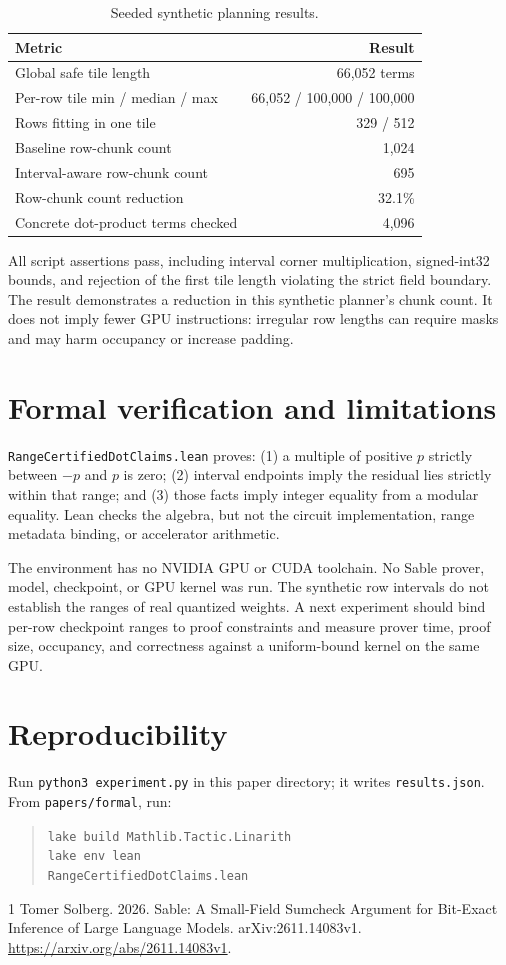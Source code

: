 \documentclass[11pt]{article}
\begin{document}
\begin{table}[t]
\centering\small
\setlength{\tabcolsep}{3pt}\begin{tabular}{p{3.6cm}r}
\toprule
Metric & Result \\
\midrule
Global safe tile length & 66,052 terms \\
Per-row tile min / median / max & 66,052 / 100,000 / 100,000 \\
Rows fitting in one tile & 329 / 512 \\
Baseline row-chunk count & 1,024 \\
Interval-aware row-chunk count & 695 \\
Row-chunk count reduction & 32.1\% \\
Concrete dot-product terms checked & 4,096 \\
\bottomrule
\end{tabular}
\caption{Seeded synthetic planning results.}
\label{tab:results}
\end{table}

All script assertions pass, including interval corner multiplication, signed-int32 bounds, and rejection of the first tile length violating the strict field boundary. The result demonstrates a reduction in this synthetic planner's chunk count. It does not imply fewer GPU instructions: irregular row lengths can require masks and may harm occupancy or increase padding.

\section{Formal verification and limitations}
\texttt{RangeCertifiedDotClaims.lean} proves: (1) a multiple of positive $p$ strictly between $-p$ and $p$ is zero; (2) interval endpoints imply the residual lies strictly within that range; and (3) those facts imply integer equality from a modular equality. Lean checks the algebra, but not the circuit implementation, range metadata binding, or accelerator arithmetic.

The environment has no NVIDIA GPU or CUDA toolchain. No Sable prover, model, checkpoint, or GPU kernel was run. The synthetic row intervals do not establish the ranges of real quantized weights. A next experiment should bind per-row checkpoint ranges to proof constraints and measure prover time, proof size, occupancy, and correctness against a uniform-bound kernel on the same GPU.

\section*{Reproducibility}
Run \texttt{python3 experiment.py} in this paper directory; it writes \texttt{results.json}. From \texttt{papers/formal}, run:\begin{quote}\small\texttt{lake build Mathlib.Tactic.Linarith}\\\texttt{lake env lean} \\ \texttt{RangeCertifiedDotClaims.lean}\end{quote}

\begin{thebibliography}{1}
Tomer Solberg. 2026. Sable: A Small-Field Sumcheck Argument for Bit-Exact Inference of Large Language Models. arXiv:2611.14083v1. \url{https://arxiv.org/abs/2611.14083v1}.
\end{thebibliography}
\end{document}
